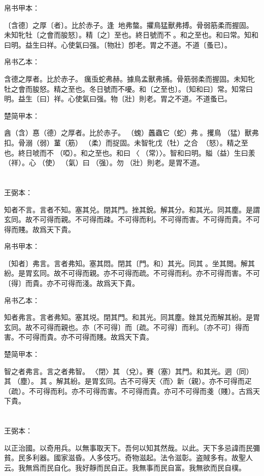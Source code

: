 \documentclass[a5paper]{ctexbook}
\begin{document}
    
    帛书甲本：

    〔含德〕之厚〔者〕。比於赤子。逢𢔯𧍥地弗螫。㩴鳥猛獸弗搏。骨弱筋柔而握固。未知牝牡〔之會而朘怒〕。精〔之〕至也。終日號而不𢖻。和之至也。和曰常。知和曰明。益生曰祥。心使氣曰强。〔物壯〕卽老。胃之不道。不道〔蚤已〕。

    帛书乙本：

    含德之厚者。比於赤子。𧒒癘䖝蛇弗赫。據鳥孟獸弗捕。骨筋弱柔而握固。未知牝牡之會而朘怒。精之至也。冬日號而不嚘。和〔之至也〕。〔知和曰〕常。知常曰明。益生〔曰〕祥。心使氣曰强。物〔壯〕則老。胃之不道。不道蚤已。

    楚简甲本：

    酓（含）惪（德）之厚者。比於赤子。󶵎（螝）䘍蟲它（蛇）弗𧍷。攫鳥󶵏（猛）獸弗扣。骨溺（弱）蓳（筋）󶵐（柔）而捉固。未智牝戊（牡）之合󶵑󶵒（怒）。精之至也。終日唬而不𪬐（啞）。和之至也。和曰󶵓〈󼲗（常）〉。智和曰明。賹（益）生曰羕（祥）。心󶴎（使）󶴓（氣）曰󶴔（强）。勿𡒉（壯）則老。是胃不道。

    \chapter{}
    王弼本：

    知者不言。言者不知。塞其兑。閉其門。挫其銳。解其分。和其光。同其塵。是謂玄同。故不可得而親。不可得而疎。不可得而利。不可得而害。不可得而貴。不可得而賤。故爲天下貴。

    
    帛书甲本：

    〔知者〕弗言。言者弗知。塞其悶。閉其〔門。和〕其光。同其𡑁。坐其閲。解其紛。是胃玄同。故不可得而親。亦不可得而疏。不可得而利。亦不可得而害。不可〔得〕而貴。亦不可得而淺。故爲天下貴。

    帛书乙本：

    知者弗言。言者弗知。塞其㙂。閉其門。和其光。同其塵。銼其兑而解其紛。是胃玄同。故不可得而親也。亦〔不可得〕而〔疏。不可得〕而利。〔亦不可〕得而害。不可得而貴。亦不可得而賤。故爲天下貴。

    楚简甲本：

    智之者弗言。言之者弗智。𨳮〈閉〉其𨓚（兌）。賽（塞）其門。和其光。迵（同）其󶴤（塵）。󶴤其󶩴。解其紛。是胃玄同。古不可得天〈而〉新（親）。亦不可得而疋（疏）。不可得而利。亦不可得而害。不可得而貴。亦可不可得而戔（賤）。古爲天下貴。

    \chapter{}
    王弼本：

    以正治國。以奇用兵。以無事取天下。吾何以知其然哉。以此。天下多忌諱而民彌貧。民多利器。國家滋昏。人多伎巧。奇物滋起。法令滋彰。盗賊多有。故聖人云。我無爲而民自化。我好靜而民自正。我無事而民自富。我無欲而民自樸。
\end{document}
